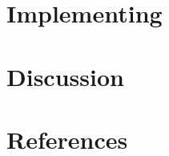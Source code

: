 \documentclass[article]{jss}
\begin{document}
\section[Implementing hurdlr]{Implementing }


\section{Discussion}


\section*{References}
\end{document}
